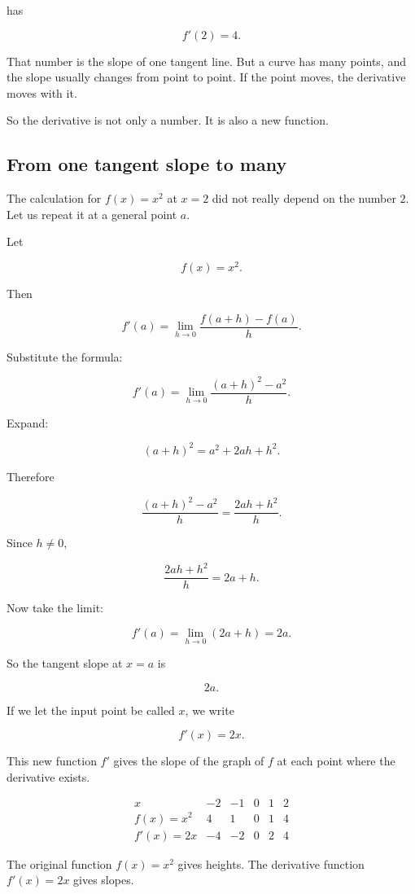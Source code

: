 has

\[
f'(2)=4.
\]

That number is the slope of one tangent line.  But a curve has many points, and the slope usually changes from point to point.  If the point moves, the derivative moves with it.

So the derivative is not only a number.  It is also a new function.

\subsection{From one tangent slope to many}
\label{subsec:one-slope-to-many}

The calculation for \(f(x)=x^2\) at \(x=2\) did not really depend on the number \(2\).  Let us repeat it at a general point \(a\).

Let

\[
f(x)=x^2.
\]

Then

\[
f'(a)
=
\lim_{h\to0}\frac{f(a+h)-f(a)}{h}.
\]

Substitute the formula:

\[
f'(a)
=
\lim_{h\to0}\frac{(a+h)^2-a^2}{h}.
\]

Expand:

\[
(a+h)^2=a^2+2ah+h^2.
\]

Therefore

\[
\frac{(a+h)^2-a^2}{h}
=
\frac{2ah+h^2}{h}.
\]

Since \(h\neq0\),

\[
\frac{2ah+h^2}{h}=2a+h.
\]

Now take the limit:

\[
f'(a)=\lim_{h\to0}(2a+h)=2a.
\]

So the tangent slope at \(x=a\) is

\[
2a.
\]

If we let the input point be called \(x\), we write

\[
\boxed{f'(x)=2x.}
\]

This new function \(f'\) gives the slope of the graph of \(f\) at each point where the derivative exists.

\[
\begin{array}{c|ccccc}
x & -2 & -1 & 0 & 1 & 2 \\ \hline
f(x)=x^2 & 4 & 1 & 0 & 1 & 4 \\
f'(x)=2x & -4 & -2 & 0 & 2 & 4
\end{array}
\]

The original function \(f(x)=x^2\) gives heights.  The derivative function \(f'(x)=2x\) gives slopes.

